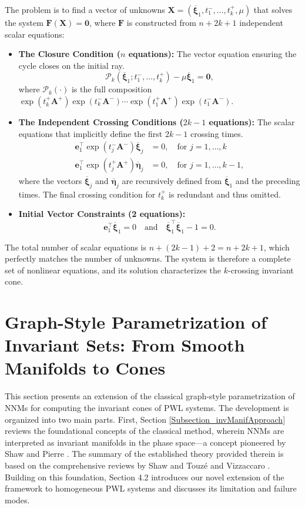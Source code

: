 \documentclass[a4paper,9pt,parskip=half,english]{article}
\theoremstyle{plain}
\theoremstyle{definition}
\newcommand{\T}{^{\!\top}} %
\newcommand{\veta}{\bm{\eta}}
\newcommand{\vxi}{\bm{\xi}}
\newcommand{\ve}{\mathbf e}
\newcommand{\vA}{\mathbf A}
\newcommand{\vF}{\mathbf F}
\begin{document}
The problem is to find a vector of unknowns $\mathbf{X} = (\overline{\vxi}_1, t_1^-, \dots, t_k^+, \mu)$ that solves the system $\vF(\mathbf{X}) = \bm{0}$, where $\vF$ is constructed from $n + 2k + 1$ independent scalar equations:
\begin{itemize}
	\item \textbf{The Closure Condition ($n$ equations):} The vector equation ensuring the cycle closes on the initial ray.
	\begin{equation*}
		\mathcal{P}_k(\overline{\vxi}_1; t_1^-, \dots, t_k^+) - \mu\overline{\vxi}_1 = \bm{0},
	\end{equation*}
	where $\mathcal{P}_k(\cdot)$ is the full composition $\exp(t_k^+\vA^+)\exp(t_k^-\vA^-) \cdots \exp(t_1^+\vA^+)\exp(t_1^-\vA^-)$.
	
	\item \textbf{The Independent Crossing Conditions ($2k-1$ equations):} The scalar equations that implicitly define the first $2k-1$ crossing times.
	\begin{align*}
		\ve_1\T \exp(t_j^- \vA^-) \overline{\vxi}_j &= 0, \quad \text{for } j=1, \dots, k \\
		\ve_1\T \exp(t_j^+ \vA^+) \overline{\veta}_j &= 0, \quad \text{for } j=1, \dots, k-1,
	\end{align*}
	where the vectors $\overline{\vxi}_j$ and $\overline{\veta}_j$ are recursively defined from $\overline{\vxi}_1$ and the preceding times. The final crossing condition for $t_k^+$ is redundant and thus omitted.
	
	\item \textbf{Initial Vector Constraints (2 equations):}
	\begin{equation*}
		\ve_1\T \overline{\vxi}_1 = 0 \quad \text{and} \quad \overline{\vxi}_1\T \overline{\vxi}_1 - 1 = 0.
	\end{equation*}
\end{itemize}
The total number of scalar equations is $n + (2k-1) + 2 = n + 2k + 1$, which perfectly matches the number of unknowns. The system is therefore a complete set of nonlinear equations, and its solution characterizes the $k$-crossing invariant cone.

\section{Graph-Style Parametrization of Invariant Sets: From Smooth Manifolds to Cones}\label{section:graphstyle}
This section presents an extension of the classical graph-style parametrization of NNMs for computing the invariant cones of PWL systems. The development is organized into two main parts. First, Section \ref{Subsection_invManifApproach} reviews the foundational concepts of the classical method, wherein NNMs are interpreted as invariant manifolds in the phase space—a concept pioneered by Shaw and Pierre \cite{Shaw1991, Shaw1993}. The summary of the established theory provided therein is based on the comprehensive reviews by Shaw \cite{Shaw2014} and Touzé and Vizzaccaro \cite{Touze2024}. Building on this foundation, Section 4.2 introduces our novel extension of the framework to homogeneous PWL systems and discusses its limitation and failure modes.
\end{document}
